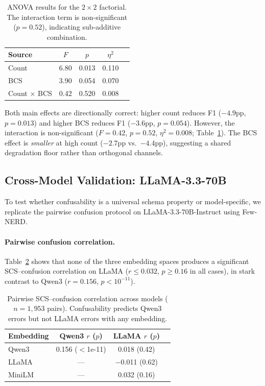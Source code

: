 \documentclass[11pt,a4paper]{article}
\begin{document}
\begin{table}[t]
\centering
\small
\begin{tabular}{lcccc}
\toprule
Source & $F$ & $p$ & $\eta^2$ \\
\midrule
Count & 6.80 & 0.013 & 0.110 \\
BCS & 3.90 & 0.054 & 0.070 \\
Count $\times$ BCS & 0.42 & 0.520 & 0.008 \\
\bottomrule
\end{tabular}
\caption{ANOVA results for the $2{\times}2$ factorial. The interaction term is non-significant ($p{=}0.52$), indicating sub-additive combination.}
\label{tab:anova}
\end{table}

Both main effects are directionally correct: higher count reduces F1 ($-4.9$pp, $p{=}0.013$) and higher BCS reduces F1 ($-3.6$pp, $p{=}0.054$). However, the interaction is non-significant ($F{=}0.42$, $p{=}0.52$, $\eta^2{=}0.008$; Table~\ref{tab:anova}). The BCS effect is \emph{smaller} at high count ($-2.7$pp vs.\ $-4.4$pp), suggesting a shared degradation floor rather than orthogonal channels.

\subsection{Cross-Model Validation: LLaMA-3.3-70B}
\label{sec:crossmodel}

To test whether confusability is a universal schema property or model-specific, we replicate the pairwise confusion protocol on LLaMA-3.3-70B-Instruct using Few-NERD.

\paragraph{Pairwise confusion correlation.} Table~\ref{tab:crossmodel_pairwise} shows that none of the three embedding spaces produces a significant SCS--confusion correlation on LLaMA ($r \leq 0.032$, $p \geq 0.16$ in all cases), in stark contrast to Qwen3 ($r{=}0.156$, $p{<}10^{-11}$).

\begin{table}[t]
\centering
\small
\begin{tabular}{lccc}
\toprule
Embedding & Qwen3 $r$ ($p$) & LLaMA $r$ ($p$) \\
\midrule
Qwen3 & 0.156 ($<$1e-11) & 0.018 (0.42) \\
LLaMA & --- & $-$0.011 (0.62) \\
MiniLM & --- & 0.032 (0.16) \\
\bottomrule
\end{tabular}
\caption{Pairwise SCS--confusion correlation across models ($n{=}1{,}953$ pairs). Confusability predicts Qwen3 errors but not LLaMA errors with any embedding.}
\label{tab:crossmodel_pairwise}
\end{table}
\end{document}
